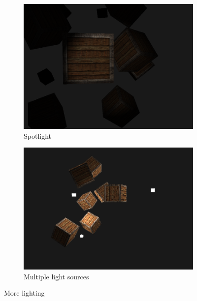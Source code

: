 \documentclass[a4paper, 12pt]{article}
\begin{document}
    \begin{figure}[H]
        \centering
        \begin{subfigure}[b]{0.45\textwidth}
            \centering
            \includegraphics[width=\textwidth]{spotLight.png}
            \caption{Spotlight}
        \end{subfigure}
        \hfill
        \begin{subfigure}[b]{0.45\textwidth}
            \centering
            \includegraphics[width=\textwidth]{multipleLightsAndSpotlight.png}
            \caption{Multiple light sources}
        \end{subfigure}
        \caption{More lighting}
    \end{figure}
\end{document}
